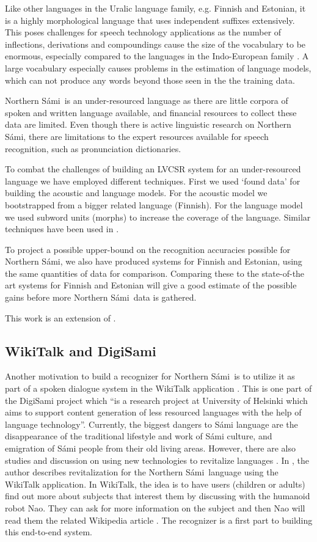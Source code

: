 \documentclass[b5paper]{article}
\newcommand{\ns}{Northern Sámi}
\begin{document}
Like other languages in the Uralic language family, e.g. Finnish and Estonian, it is a highly morphological language that uses independent suffixes extensively. This poses challenges for speech technology applications as the number of inflections, derivations and compoundings cause the size of the vocabulary to be enormous, especially compared to the languages in the Indo-European family \cite{karlsson1982}.  A large vocabulary especially causes problems in the estimation of language models, which can not produce any words beyond those seen in the the training data. 

\ns\ is an under-resourced language as there are little corpora of spoken and written language available, and financial resources to collect these data are limited. Even though there is active linguistic research on \ns, there are limitations to the expert resources available for speech recognition, such as pronunciation dictionaries. 

To combat the challenges of building an LVCSR system for an under-resourced language we have employed different techniques. First we used `found data' for building the acoustic and language models. For the acoustic model we bootstrapped from a bigger related language (Finnish). For the language model we used subword units (morphs) to increase the coverage of the language. Similar techniques have been used in \cite{besacier2014automatic,viet2009}.

To project a possible upper-bound on the recognition accuracies possible for \ns, we also have produced systems for Finnish and Estonian, using the same quantities of data for comparison. Comparing these to the state-of-the art systems for Finnish and Estonian will give a good estimate of the possible gains before more \ns\ data is gathered.

This work is an extension of \cite{leinonen2015}.

\subsection{WikiTalk and DigiSami}
Another motivation to build a recognizer for \ns\ is to utilize it as part of  a spoken dialogue system in the WikiTalk application \cite{wilcock2013wikitalk}. This is one part of the DigiSami project which ``is a research project at University of Helsinki which aims to support content generation of less resourced languages with the help of language technology''. Currently, the biggest dangers to Sámi language are the disappearance of the traditional lifestyle and work of Sámi culture, and emigration of Sámi people from their old living areas. However, there are also studies and discussion on using new technologies to revitalize languages \cite{eisenlohr2004language}. In \cite{jokinen2014open}, the author describes revitalization for the \ns\ language using the WikiTalk application. In WikiTalk, the idea is to have users (children or adults) find out more about subjects that interest them by discussing with the humanoid robot Nao. They can ask for more information on the subject and then Nao will read them the related Wikipedia article \cite{jokinen2014multimodal}. The recognizer is a first part to building this end-to-end system.
\end{document}
